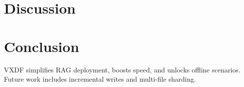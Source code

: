 \documentclass[10pt,twocolumn]{article}
\begin{document}
\section{Discussion}

\section{Conclusion}
VXDF simplifies RAG deployment, boosts speed, and unlocks offline scenarios. Future work includes incremental writes and multi-file sharding.



\end{document}

